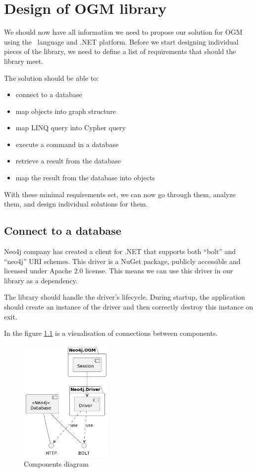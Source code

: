 \chapter {Design of OGM library}

We should now have all information we need to propose our solution for OGM using the \CS\ language and .NET platform.
Before we start designing individual pieces of the library, we need to define a list of requirements that should the library meet.

The solution should be able to:
\begin{itemize}
	\item {connect to a database}
	\item {map objects into graph structure}
	\item {map LINQ query into Cypher query}
	\item {execute a command in a database}
	\item {retrieve a result from the database}
	\item {map the result from the database into objects}
\end{itemize}

With these minimal requirements set, we can now go through them, analyze them, and design individual solutions for them.

\section{Connect to a database}

Neo4j company has created a client for .NET that supports both ``bolt'' and ``neo4j'' URI schemes. \cite{neo4j_client_nodate}
This driver is a NuGet package, publicly accessible and licensed under Apache 2.0 license.
This means we can use this driver in our library as a dependency.

The library should handle the driver's lifecycle.
During startup, the application should create an instance of the driver and then correctly destroy this instance on exit.

In the figure \ref{fig:components} is a visualisation of connections between components.

\begin{figure}[H]
	\centering
	\includegraphics[width=0.4\textwidth]{content/components.png}
	\caption{Components diagram}
	\label{fig:components}
\end{figure}

